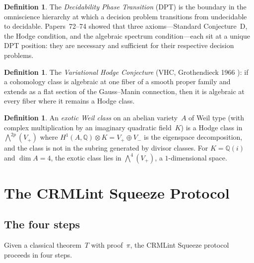 \documentclass[11pt]{article}
\theoremstyle{plain}
\theoremstyle{definition}
\newtheorem{definition}[theorem]{Definition}
\theoremstyle{remark}
\newcommand{\QQ}{\mathbb{Q}}
\begin{document}
\begin{definition}
The \emph{Decidability Phase Transition} (DPT) is the boundary in
the omniscience hierarchy at which a decision problem transitions
from undecidable to decidable.  Papers~72--74 \cite{p72,p73,p74}
showed that three axioms---Standard Conjecture~D, the Hodge condition,
and the algebraic spectrum condition---each sit at a unique DPT
position: they are necessary and sufficient for their respective
decision problems.
\end{definition}

\begin{definition}
The \emph{Variational Hodge Conjecture} (VHC, Grothendieck 1966
\cite{grothendieck-standard}): if a cohomology class is algebraic
at one fiber of a smooth proper family and extends as a flat section
of the Gauss--Manin connection, then it is algebraic at every fiber
where it remains a Hodge class.
\end{definition}

\begin{definition}
An \emph{exotic Weil class} on an abelian variety~$A$ of Weil type
(with complex multiplication by an imaginary quadratic field~$K$)
is a Hodge class in $\bigwedge^{2p}(V_+)$ where
$H^1(A, \QQ) \otimes K = V_+ \oplus V_-$ is the eigenspace
decomposition, and the class is not in the subring generated by
divisor classes.  For $K = \QQ(i)$ and $\dim A = 4$, the exotic
class lies in $\bigwedge^4(V_+)$, a $1$-dimensional space.
\end{definition}


\section{The CRMLint Squeeze Protocol}\label{sec:squeeze}

\subsection{The four steps}

Given a classical theorem~$T$ with proof~$\pi$, the CRMLint Squeeze
protocol proceeds in four steps.
\end{document}
